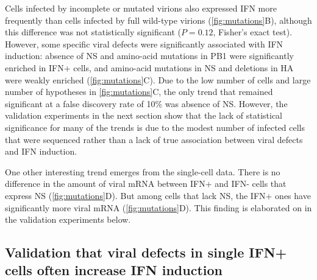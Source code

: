 \documentclass[10pt,letterpaper]{article}
\newcommand{\FIG}[1]{\autoref{fig:#1}}
\begin{document}
Cells infected by incomplete or mutated virions also expressed IFN more frequently than cells infected by full wild-type virions (\FIG{mutations}B), although this difference was not statistically significant ($P = 0.12$, Fisher's exact test).
However, some specific viral defects were significantly associated with IFN induction: absence of NS and amino-acid mutations in PB1 were significantly enriched in IFN+ cells, and amino-acid mutations in NS and deletions in HA were weakly enriched (\FIG{mutations}C).
Due to the low number of cells and large number of hypotheses in \FIG{mutations}C, the only trend that remained significant at a false discovery rate of 10\% was absence of NS.
However, the validation experiments in the next section show that the lack of statistical significance for many of the trends is due to the modest number of infected cells that were sequenced rather than a lack of true association between viral defects and IFN induction.

One other interesting trend emerges from the single-cell data.
There is no difference in the amount of viral mRNA between IFN+ and IFN- cells that express NS (\FIG{mutations}D).
But among cells that lack NS, the IFN+ ones have significantly more viral mRNA (\FIG{mutations}D).
This finding is elaborated on in the validation experiments below.

\subsection*{Validation that viral defects in single IFN+ cells often increase IFN induction}
\end{document}
